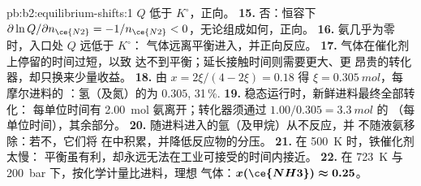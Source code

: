 \begin{solution}{pb:b2:equilibrium-shifts:1}
$Q$ 低于 $K^\circ$，正向。
\textbf{15.} 否：恒容下 $\partial\ln Q/\partial n_{\ce{N2}} =
-1/n_{\ce{N2}} < 0$，无论组成如何，正向。
\textbf{16.} 氨几乎为零时，入口处 $Q$ 远低于 $K^\circ$：
气体远离平衡进入，并正向反应。
\textbf{17.} 气体在催化剂上停留的时间过短，以致
达不到平衡；延长接触时间则需要更大、更
昂贵的转化器，却只换来少量收益。
\textbf{18.} 由 $x = 2\xi/(4 - 2\xi) = 0.18$ 得 $\xi = \qty{0.305}{mol}$，每
摩尔进料的 ：氢（及氮）的为
$0.305$, 31\,\%.
\textbf{19.} 稳态运行时，新鲜进料最终全部转化：
每单位时间有 \qty{2.00}{mol} 氨离开；转化器须通过 $1.00/
0.305 = \qty{3.3}{mol}$ 的 （每单位时间），其余部分。
\textbf{20.} 随进料进入的氩（及甲烷）从不反应，并
不随液氨移除：若不，它们将
在中积累，并降低反应物的分压。
\textbf{21.} 在 \qty{500}{K} 时，铁催化剂太慢：
平衡虽有利，却永远无法在工业可接受的时间内接近。
\textbf{22.} 在 \qty{723}{K} 与 \qty{200}{bar} 下，按化学计量比进料，理想
气体：$\boldsymbol{x(\ce{NH3}) \approx 0.25}$。
\end{solution}
